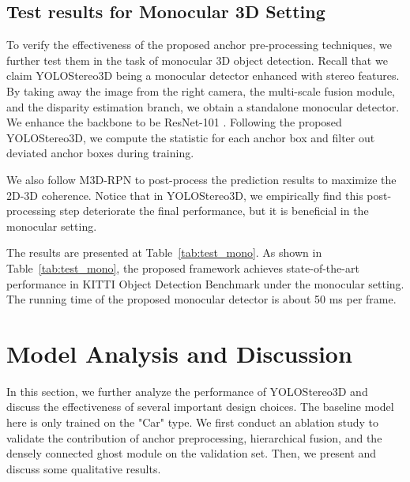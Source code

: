 \documentclass[letterpaper, 10 pt, conference]{ieeeconf}
\begin{document}
 \subsection{Test results for Monocular 3D Setting}
 To verify the effectiveness of the proposed anchor pre-processing techniques, we further test them in the task of monocular 3D object detection.
 Recall that we claim YOLOStereo3D being a monocular detector enhanced with stereo features. By taking away the image from the right camera, the multi-scale fusion module, and the disparity estimation branch, we obtain a standalone monocular detector. We enhance the backbone to be ResNet-101 \cite{He2015Resnet}. Following the proposed YOLOStereo3D, we compute the statistic for each anchor box and filter out deviated anchor boxes during training. 

 We also follow M3D-RPN \cite{Brazil2019M3DRPN} to post-process the prediction results to maximize the 2D-3D coherence. Notice that in YOLOStereo3D, we empirically find this post-processing step deteriorate the final performance, but it is beneficial in the monocular setting.
 
 The results are presented at Table~\ref{tab:test_mono}. 
 As shown in Table~\ref{tab:test_mono}, the proposed framework achieves state-of-the-art performance in KITTI Object Detection Benchmark under the monocular setting. The running time of the proposed monocular detector is about 50 ms per frame.

 \section{Model Analysis and Discussion}
 \label{section:Discussion}

 In this section, we further analyze the performance of YOLOStereo3D and discuss the effectiveness of several important design choices. 
 The baseline model here is only trained on the "Car" type.
We first conduct an ablation study to validate the contribution of anchor preprocessing, hierarchical fusion, and the densely connected ghost module on the validation set.
Then, we present and discuss some qualitative results.
\end{document}

